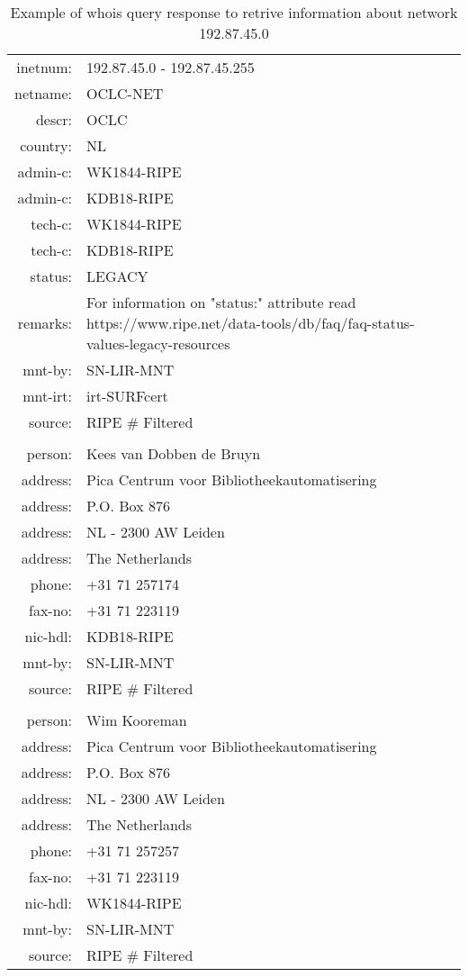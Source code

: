\documentclass[11pt,a4paper]{scrreprt}
\begin{document}
\begin{table}[h!]
\centering
\begin{tabular}{  r  l  }
 
 inetnum:  & 	192.87.45.0 - 192.87.45.255 \\
 netname:  & 	OCLC-NET \\
 descr:    &	OCLC \\
 country:  & 	NL \\
 admin-c:  & 	WK1844-RIPE \\
 admin-c:  & 	KDB18-RIPE \\
 tech-c:   & 	WK1844-RIPE \\
 tech-c:   & 	KDB18-RIPE \\
 status:   & 	LEGACY \\
 remarks:  & 	For information on "status:" attribute read https://www.ripe.net/data-tools/db/faq/faq-status-values-legacy-resources \\
 mnt-by:   & 	SN-LIR-MNT \\
 mnt-irt:  & 	irt-SURFcert \\
 source:   & 	RIPE \# Filtered \\
 \\
 person:   & 	Kees van Dobben de Bruyn \\
 address:  & 	Pica Centrum voor Bibliotheekautomatisering \\
 address:  & 	P.O. Box 876 \\
 address:  & 	NL - 2300 AW Leiden \\
 address:  & 	The Netherlands \\
 phone:    & 	+31 71 257174 \\
 fax-no:   & 	+31 71 223119 \\
 nic-hdl:  & 	KDB18-RIPE \\
 mnt-by:   &  	SN-LIR-MNT   \\
 source:   & 	RIPE \# Filtered \\
 \\
 person:   &    Wim Kooreman\\
 address:  &    Pica Centrum voor Bibliotheekautomatisering\\
 address:  &    P.O. Box 876\\
 address:  &    NL - 2300 AW Leiden\\
 address:  &    The Netherlands\\
 phone:    &    +31 71 257257\\
 fax-no:   &    +31 71 223119\\
 nic-hdl:  &    WK1844-RIPE\\
 mnt-by:   &    SN-LIR-MNT\\
 source:   &    RIPE \# Filtered\\
 
\end{tabular}
\caption{Example of whois query response to retrive information about network 192.87.45.0}
\label{table:2}
\end{table}     
        
\end{document}
